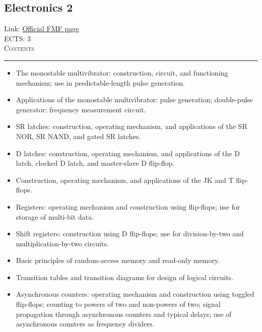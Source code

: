 \documentclass[11pt, a4paper]{article}
\newenvironment{course}[3]{
\subsection{#1}%
Link: \href{#2}{Official FMF page}\\%
ECTS: #3%
\vspace{1ex}
\\
{\large \textsc{Contents}}\\[-0.9ex]%
\rule{\textwidth}{0.5pt}
\vspace{-3ex}
}
{}
\newenvironment{chapter}[1]{
\begin{tcolorbox}[title=#1, breakable]
}
{\end{tcolorbox}}
\begin{document}
\begin{course}{Electronics 2}{https://www.fmf.uni-lj.si/en/study-physics/programmes/1fiz/2020/7000777/courses/1135/}{3}
\begin{chapter}{Foundations of digital electronics}
\begin{itemize}
            \item The monostable multivibrator: construction, circuit, and functioning mechanism; use in predictable-length pulse generation.

            \item Applications of the monostable multivibrator: pulse generation; double-pulse generator; frequency measurement circuit.
        
        \end{itemize}
    \end{chapter}

    \begin{chapter}{Flip-flops and registers}
        \begin{itemize}
        
            \item SR latches: construction, operating mechanism, and applications of the SR NOR, SR NAND, and gated SR latches.

            \item D latches: construction, operating mechanism, and applications of the D latch, clocked D latch, and master-slave D flip-flop.

            \item Construction, operating mechanism, and applications of the JK and T flip-flops.

            \item Registers: operating mechanism and construction using flip-flops; use for storage of multi-bit data.

            \item Shift registers: construction using D flip-flops; use for division-by-two and multiplication-by-two circuits.

            \item Basic principles of random-access memory and read-only memory.
        
        \end{itemize}
    \end{chapter}

    \begin{chapter}{Counters and finite-state machines}
        \begin{itemize}

            \item Transition tables and transition diagrams for design of logical circuits.
        
            \item Asynchronous counters: operating mechanism and construction using toggled flip-flops; counting to powers of two and non-powers of two; signal propagation through asynchronous counters and typical delays; use of asynchronous counters as frequency dividers.


\end{itemize}
\end{chapter}
\end{course}
\end{document}
